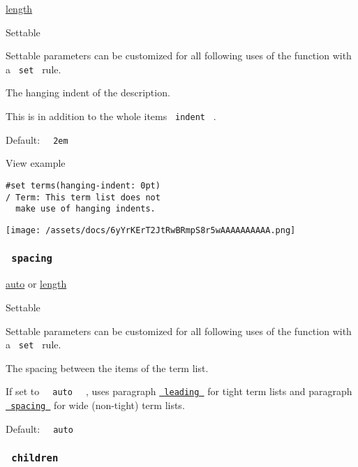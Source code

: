 \href{/docs/reference/layout/length/}{length}

{{ Settable }}

\label{parameters-hanging-indent-settable-tooltip}
Settable parameters can be customized for all following uses of the
function with a \texttt{\ set\ } rule.

The hanging indent of the description.

This is in addition to the whole item\textquotesingle s
\texttt{\ indent\ } .

Default: \texttt{\ }{\texttt{\ 2em\ }}\texttt{\ }


View example

\begin{verbatim}
#set terms(hanging-indent: 0pt)
/ Term: This term list does not
  make use of hanging indents.
\end{verbatim}

\texttt{[image: /assets/docs/6yYrKErT2JtRwBRmpS8r5wAAAAAAAAAA.png]}

\subsubsection{\texorpdfstring{\texttt{\ spacing\ }}{ spacing }}\label{parameters-spacing}

\href{/docs/reference/foundations/auto/}{auto} {or}
\href{/docs/reference/layout/length/}{length}

{{ Settable }}

\label{parameters-spacing-settable-tooltip}
Settable parameters can be customized for all following uses of the
function with a \texttt{\ set\ } rule.

The spacing between the items of the term list.

If set to \texttt{\ }{\texttt{\ auto\ }}\texttt{\ } , uses paragraph
\href{/docs/reference/model/par/\#parameters-leading}{\texttt{\ leading\ }}
for tight term lists and paragraph
\href{/docs/reference/model/par/\#parameters-spacing}{\texttt{\ spacing\ }}
for wide (non-tight) term lists.

Default: \texttt{\ }{\texttt{\ auto\ }}\texttt{\ }

\subsubsection{\texorpdfstring{\texttt{\ children\ }}{ children }}\label{parameters-children}


